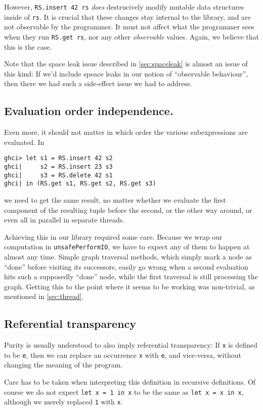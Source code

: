 \documentclass[manuscript,screen,acmsmall]{acmart}
\begin{document}
However, \verb|RS.insert 42 rs| \emph{does} destrucively modify mutable data structures inside of \verb|rs|. It is crucial that these changes stay internal to the library, and are not observable by the programmer. It must not affect what the programmer sees when they run \verb|RS.get rs|, nor any other \emph{observable} values. Again, we believe that this is the case.

Note that the space leak issue described in \cref{sec:spaceleak} is almost an issue of this kind: If we’d include speace leaks in our notion of “observable behaviour”, then there we had such a side-effect issue we had to address.

\subsection{Evaluation order independence.}

Even more, it should not matter in which order the various subexpressions are evaluated. In
\begin{verbatim}
ghci> let s1 = RS.insert 42 s2
ghci|     s2 = RS.insert 23 s3
ghci|     s3 = RS.delete 42 s1
ghci| in (RS.get s1, RS.get s2, RS.get s3)
\end{verbatim}
we need to get the same result, no matter whether we evaluate the first component of the resulting tuple before the second, or the other way around, or even all in parallel in separate threads.

Achieving this in our library required some care. Because we wrap our computation in \verb|unsafePerformIO|, we have to expect any of them to happen at almost any time. Simple graph traversal methods, which simply mark a node as “done” before visiting its successors, easily go wrong when a second evaluation hits such a supposedly “done” node, while the first traversal is still processing the graph. Getting this to the point where it seems to be working was non-trivial, as mentioned in \cref{sec:thread}.

\subsection{Referential transparency}

Purity is usually understood to also imply referential transparency: If \verb|x| is defined to be \verb|e|, then we can replace an occurrence \verb|x| with \verb|e|, and vice-versa, without changing the meaning of the program.

Care has to be taken when interpreting this definition in recursive definitions. Of course we do not expect \verb|let x = 1 in x| to be the same as \verb|let x = x in x|, although we merely replaced \verb|1| with \verb|x|.
\end{document}
